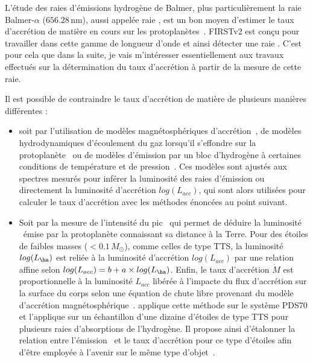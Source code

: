 L'étude des raies d'émissions hydrogène de Balmer, plus particulièrement la raie Balmer-$\alpha$ ($656.28 \,$nm), aussi appelée raie \ha, est un bon moyen d'estimer le taux d'accrétion de matière en cours sur les protoplanètes~\citep{aoyama2019, marleau2022}. \ac{FIRSTv2} est conçu pour travailler dans cette gamme de longueur d'onde et ainsi détecter une raie \ha. C'est pour cela que dans la suite, je vais m'intéresser essentiellement aux travaux effectués sur la détermination du taux d'accrétion à partir de la mesure de cette raie.

Il est possible de contraindre le taux d'accrétion de matière de plusieurs manières différentes :

\begin{itemize}
    \item soit par l'utilisation de modèles magnétosphériques d'accrétion~\citep{natta2004, ingleby2013, thanathibodee2019}, de modèles hydrodynamiques d'écoulement du gaz lorsqu'il s'effondre sur la protoplanète~\citep{aoyama2018, aoyama2019, aoyama2020} ou de modèles d'émission par un bloc d'hydrogène à certaines conditions de température et de pression~\citep{alcala2017, rigliaco2012}. Ces modèles sont ajustés aux spectres mesurés pour inférer la luminosité des raies d'émission ou directement la luminosité d'accrétion $log(L_{acc})$, qui sont alors utilisées pour calculer le taux d'accrétion avec les méthodes énoncées au point suivant.
    
    \item Soit par la mesure de l'intensité du pic \ha~qui permet de déduire la luminosité \ha~émise par la protoplanète connaissant sa distance à la Terre. Pour des étoiles de faibles masses ($< 0.1 \, M_{\odot}$), comme celles de type \ac{TTS}, la luminosité $log(L_{\text{\ha}})$ est reliée à la luminosité d'accrétion $log(L_{acc})$ par une relation affine selon $log(L_{acc}) = b + a \times log(L_{\text{\ha}})$. Enfin, le taux d'accrétion $\dot{M}$ est proportionnelle à la luminosité $L_{acc}$ libérée à l'impacte du flux d'accrétion sur la surface du corps selon une équation de chute libre provenant du modèle d'accrétion magnétosphérique~\citep{gullbring1998}. \cite{wagner2018} applique cette méthode sur le système PDS70 et \cite{rigliaco2012} l'applique sur un échantillon d'une dizaine d'étoiles de type \ac{TTS} pour plusieurs raies d'absorptions de l'hydrogène. Il propose ainsi d'étalonner la relation entre l'émission \ha~et le taux d'accrétion pour ce type d'étoiles afin d'être employée à l'avenir sur le même type d'objet~\citep{close2014}.
    

\end{itemize}
